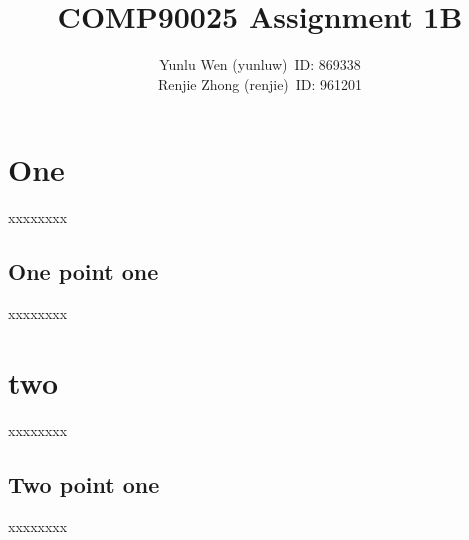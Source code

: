 \documentclass[12pt, a4paper, twocolumn]{article}
\title{COMP90025 Assignment 1B}
\author{Yunlu Wen (yunluw)\ ID: 869338\\ Renjie Zhong (renjie)\ ID: 961201}
\begin{document}
    \maketitle

    \section{One}
    xxxxxxxx
    \subsection{One point one}
    xxxxxxxx

    \section{two}
    xxxxxxxx
    \subsection{Two point one}
    xxxxxxxx
\end{document}
